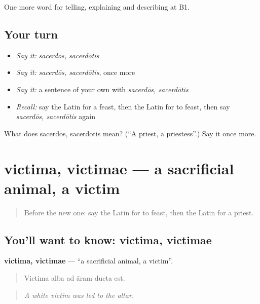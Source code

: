 \begin{grammarlens}[title={What you've built}]
One more word for telling, explaining and describing at B1.
\end{grammarlens}

\subsection*{Your turn}
\begin{itemize}
\raggedright
  \item \emph{Say it:} \emph{sacerdōs, sacerdōtis}
  \item \emph{Say it:} \emph{sacerdōs, sacerdōtis}, once more
  \item \emph{Say it:} a sentence of your own with \emph{sacerdōs, sacerdōtis}
  \item \emph{Recall:} say the Latin for a feast, then the Latin for to feast, then say \emph{sacerdōs, sacerdōtis} again
\end{itemize}

\begin{tcolorbox}[breakable,colback=teal!4,colframe=teal!35!black,title={Before you move on}]
What does sacerdōs, sacerdōtis mean? (\textquotedblleft{}A priest, a priestess\textquotedblright{}.) Say it once more.
\end{tcolorbox}
\section[victima, victimae]{victima, victimae — a sacrificial animal, a victim}

\label{lesson:LA-C334-victima}



\begin{quote}
Before the new one: say the Latin for to feast, then the Latin for a priest.
\end{quote}

\subsection*{You'll want to know: victima, victimae}
\textbf{victima, victimae} — \textquotedblleft{}a sacrificial animal, a victim\textquotedblright{}.

\begin{quote}
Victima alba ad āram ducta est.
\end{quote}

\begin{quote}
\emph{A white victim was led to the altar.}
\end{quote}

